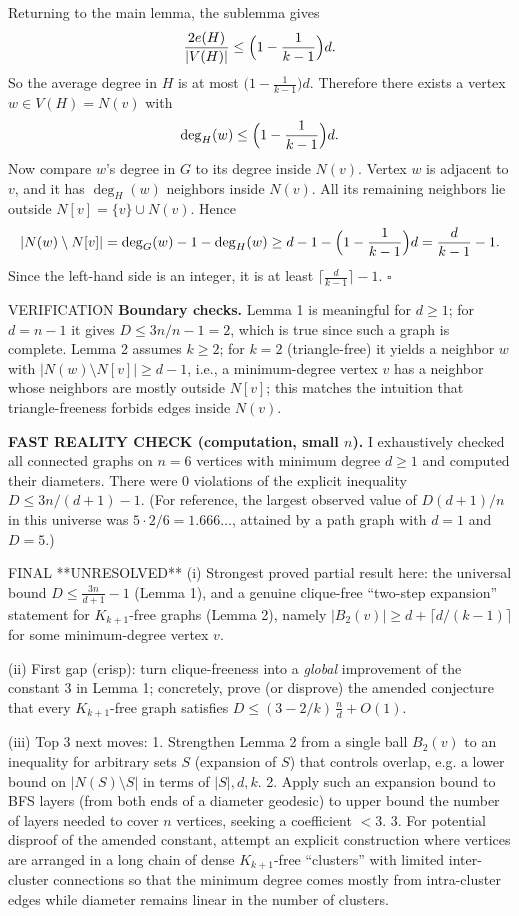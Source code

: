 Returning to the main lemma, the sublemma gives
\[
\frac{2e(H)}{|V(H)|} \le \Bigl(1-\frac{1}{k-1}\Bigr)d.
\]
So the average degree in $H$ is at most $\bigl(1-\frac{1}{k-1}\bigr)d$.
Therefore there exists a vertex $w\in V(H)=N(v)$ with
\[
\deg_H(w) \le \Bigl(1-\frac{1}{k-1}\Bigr)d.
\]
Now compare $w$'s degree in $G$ to its degree inside $N(v)$.
Vertex $w$ is adjacent to $v$, and it has $\deg_H(w)$ neighbors inside $N(v)$.
All its remaining neighbors lie outside $N[v]=\{v\}\cup N(v)$.
Hence
\[
|N(w)\setminus N[v]| = \deg_G(w) - 1 - \deg_H(w)
\ge d - 1 - \Bigl(1-\frac{1}{k-1}\Bigr)d
= \frac{d}{k-1}-1.
\]
Since the left-hand side is an integer, it is at least
$\lceil \frac{d}{k-1}\rceil-1$.
\hfill $\square$

VERIFICATION
\textbf{Boundary checks.}
Lemma 1 is meaningful for $d\ge1$; for $d=n-1$ it gives $D\le 3n/n-1=2$, which is
true since such a graph is complete.
Lemma 2 assumes $k\ge2$; for $k=2$ (triangle-free) it yields a neighbor $w$ with
$|N(w)\setminus N[v]|\ge d-1$, i.e., a minimum-degree vertex $v$ has a neighbor
whose neighbors are mostly outside $N[v]$; this matches the intuition that
triangle-freeness forbids edges inside $N(v)$.

\textbf{FAST REALITY CHECK (computation, small $n$).}
I exhaustively checked all connected graphs on $n=6$ vertices with minimum degree
$d\ge1$ and computed their diameters.
There were $0$ violations of the explicit inequality
$D\le 3n/(d+1)-1$.
(For reference, the largest observed value of $D(d+1)/n$ in this universe was
$5\cdot 2/6=1.666\ldots$, attained by a path graph with $d=1$ and $D=5$.)

FINAL
**UNRESOLVED**
(i) Strongest proved partial result here: the universal bound
$D\le \frac{3n}{d+1}-1$ (Lemma 1), and a genuine clique-free ``two-step
expansion'' statement for $K_{k+1}$-free graphs (Lemma 2), namely
$|B_2(v)|\ge d+\lceil d/(k-1)\rceil$ for some minimum-degree vertex $v$.

(ii) First gap (crisp): turn clique-freeness into a \emph{global} improvement of
the constant $3$ in Lemma 1; concretely, prove (or disprove) the amended
conjecture that every $K_{k+1}$-free graph satisfies
$D\le (3-2/k)\,\frac{n}{d}+O(1)$.

(iii) Top 3 next moves:
1. Strengthen Lemma 2 from a single ball $B_2(v)$ to an inequality for arbitrary
sets $S$ (expansion of $S$) that controls overlap, e.g. a lower bound on
$|N(S)\setminus S|$ in terms of $|S|,d,k$.
2. Apply such an expansion bound to BFS layers (from both ends of a diameter
geodesic) to upper bound the number of layers needed to cover $n$ vertices,
seeking a coefficient $<3$.
3. For potential disproof of the amended constant, attempt an explicit
construction where vertices are arranged in a long chain of dense
$K_{k+1}$-free ``clusters'' with limited inter-cluster connections so that the
minimum degree comes mostly from intra-cluster edges while diameter remains
linear in the number of clusters.

